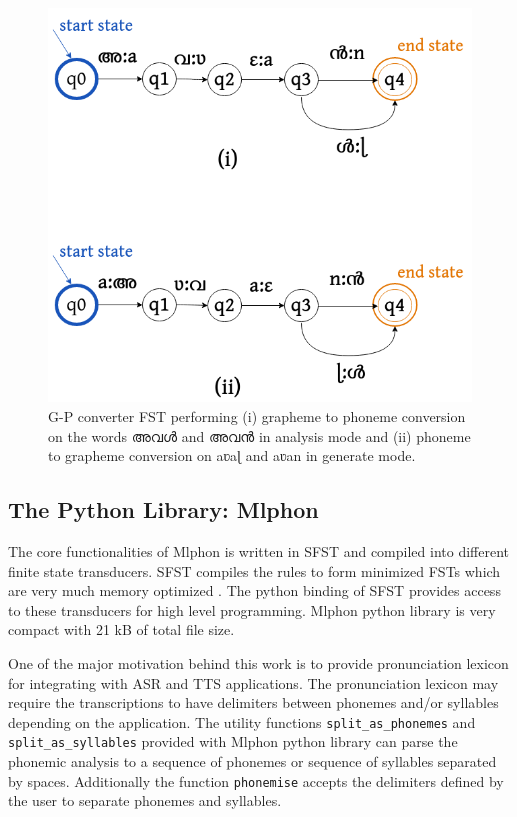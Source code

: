 \documentclass{ieeeaccess}
\begin{document}
\begin{figure}[h]
	\centering
	\includegraphics[width=0.75\linewidth]{g2p-fst-drawio.png}
	\caption{G-P converter FST performing (i) grapheme to phoneme conversion on the words  {\mal അവൾ} and {\mal അവൻ} in analysis mode and (ii) phoneme to grapheme conversion on {\ipa aʋaɭ} and {\ipa aʋan} in generate mode. }
	\label{g2pfst}
\end{figure}



\subsection{The Python Library: Mlphon}
\label{pypi}
The core functionalities of Mlphon is written in SFST and compiled into different finite state transducers. SFST compiles the rules to form minimized FSTs which are very much memory optimized \cite{mohri-1997-finite}. The python binding of SFST provides access to these transducers for high level programming. Mlphon python library is very compact with 21 kB of total file size.

One of the major motivation behind this work is to provide pronunciation lexicon  for integrating with ASR and TTS applications. The pronunciation lexicon may require the transcriptions to have delimiters between phonemes and/or syllables depending on the application. The utility functions \texttt{split\_as\_phonemes} and \texttt{split\_as\_syllables} provided with Mlphon python library can parse the phonemic analysis to a sequence of phonemes or sequence of syllables separated by spaces.  Additionally the function \texttt{phonemise} accepts the delimiters defined by the user to separate phonemes and syllables.
\end{document}
